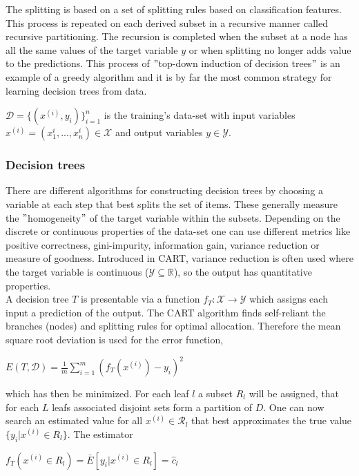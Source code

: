 \documentclass[12pt, a4paper]{article}
\begin{document}
The splitting is based on a set of splitting rules based on classification features. This process is repeated on each derived subset in a recursive manner called recursive partitioning. The recursion is completed when the subset at a node has all the same values of the target variable $y$ or when splitting no longer adds value to the predictions. This process of $"$top-down induction of decision trees$"$ is an example of a greedy algorithm and it is by far the most common strategy for learning decision trees from data.
\begin{center}
$\mathcal{D} = \{(x^{(i)},y_i)\}_{i=1}^n$ is the training's data-set with input variables $x^{(i)} = (x_1^{i} ,...,x_n^{i}) \in \mathcal{X}$ and output variables $y \in \mathcal{Y}$.
\end{center}

\subsubsection{Decision trees}
There are different algorithms for constructing decision trees by choosing a variable at each step that best splits the set of items. These generally measure the $"$homogeneity$"$ of the target variable within the subsets. Depending on the discrete or continuous properties of the data-set one can use different metrics like positive correctness, gini-impurity, information gain, variance reduction or measure of goodness.
Introduced in CART, variance reduction is often used where the target variable is continuous ($\mathcal{Y} \subseteq \mathbb{R}$), so the output has quantitative properties.\\
A decision tree $T$ is presentable via a function $f_T : \mathcal{X} \rightarrow \mathcal{Y}$ which assigns each input a prediction of the output. The CART algorithm finds self-reliant the branches (nodes) and splitting rules for optimal allocation. 
Therefore the mean square root deviation is used for the error function,
\begin{center}
    $E(T,\mathcal{D}) = \frac{1}{m} \sum_{i=1}^m (f_T(x^{(i)}) - y_i)^2$
\end{center}
which has then be minimized. For each leaf $l$ a subset $R_l$ will be assigned, that for each $L$ leafs associated disjoint sets form a partition of $D$. One can now search an estimated value for all $x^{(i)} \in \mathcal{R}_l$ that best approximates the true value $\{y_i | x^{(i)} \in R_l\}$. 
The estimator 
\begin{center}
    $f_T(x^{(i)} \in R_l) = \bar{E}[y_i | x^{(i)} \in R_l] = \hat{c}_l$
\end{center}
\end{document}
